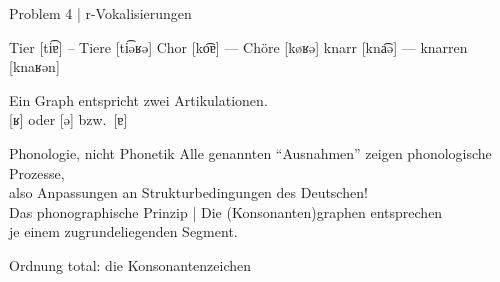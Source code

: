 \begin{frame}
  {Problem 4 | r-Vokalisierungen}
  \onslide<+->
  \onslide<+->
  \begin{exe}
    \ex Tie\alert{r} [ti͡ɐ] -- Tie\alert{r}e [ti͡əʁə]
    \ex Cho\alert{r} [ko͡ɐ] --- Chö\alert{r}e [køʁə]
    \ex kna\alert{rr} [kna͡ə] --- kna\alert{rr}en [knaʁən]
  \end{exe}
  \onslide<+->
  \Zeile
  \alert{Ein Graph} entspricht \alert{zwei Artikulationen}.\\
  \alert{[ʁ] oder [ə] bzw.\ [ɐ]} 
\end{frame}

\begin{frame}
  {Phonologie, nicht Phonetik}
  \onslide<+->
  \onslide<+->
  Alle genannten "`Ausnahmen"' zeigen \alert{phonologische Prozesse},\\
  also Anpassungen an Strukturbedingungen des Deutschen!\\
  \onslide<+->
  \Zeile
  Das phonographische Prinzip | Die \alert{(Konsonanten)graphen} entsprechen\\
  je einem \alert{zugrundeliegenden Segment}.
\end{frame}

\begin{frame}
  {Ordnung total: die Konsonantenzeichen}
  \pause
  \centering
\end{frame}

